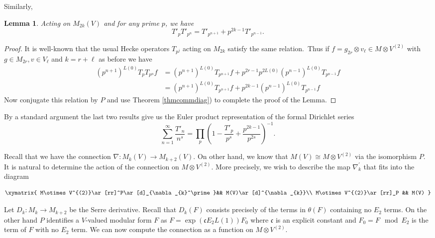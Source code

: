 \documentclass[12pt]{amsart}
\theoremstyle{plain}
\newtheorem{lem}[thm]{Lemma}
\theoremstyle{definition}
\theoremstyle{remark}
\begin{document}
Similarly,
 \begin{lem}
    Acting on $M_{2k}(V)$ and for any prime $p$,  we have 
    $$ T'_pT'_{p^n} =T'_{p^{n+1}}+p^{2k-1}T'_{p^{n-1}}.$$
 \end{lem}
 \begin{proof} It is well-known that the usual Hecke operators $T_{p^j}$ acting on $M_{2k}$ satisfy the same relation.\ Thus if $f=g_{2r}\otimes v_{\ell}\in M\otimes V^{(2)}$ with $g\in M_{2r}, v\in V_{\ell}$ and $k=r+\ell$ as before we have 
 \begin{align*} 
 (p^{n+1})^{L(0)}T_p T_{p^n}f &= (p^{n+1})^{L(0)}T_{p^{n+1}}f+ p^{2r-1}p^{2L(0)}(p^{n-1})^{L(0)}T_{p^{n-1}}f\\
 &=(p^{n+1})^{L(0)}T_{p^{n+1}}f+ p^{2k-1}(p^{n-1})^{L(0)}T_{p^{n-1}}f
 \end{align*}
 Now conjugate this relation by $P$
 and use Theorem \ref{thmcommdiag})
 to complete the proof of the Lemma.
\end{proof}

By a standard argument the last two results give us the Euler product representation of the formal Dirichlet series
\begin{equation}
\label{Dseries}
 \sum_{n=1}^{\infty} \frac{T'_n}{n^s} =
 \prod_p \left( 1 - \frac{T'_p}{p^s}+\frac{p^{2k-1}}{p^{2s}}\right)^{-1}.
\end{equation}

Recall that we have the connection $\nabla\colon M_k(V)\rightarrow M_{k+2}(V)$. On other hand, we know that $M(V)\cong M\otimes V^{(2)}$ via the isomorphism $P$. It is natural to determine the action of the connection on $M\otimes V^{(2)}$. More precisely, we wish to describe the map $\nabla_{k}^\prime$ that fits into the diagram

\begin{equation}
    \xymatrix{
M\otimes V^{(2)}\ar[rr]^P\ar[d]_{\nabla_{k}^\prime}&& M(V)\ar[d]^{\nabla_{k}}\\
M\otimes V^{(2)}\ar[rr]_P && M(V)
    }
    \end{equation}

    Let $D_k\colon M_k\rightarrow M_{k+2}$ be the Serre derivative. Recall that $D_k(F)$ consists precisely of the terms in $\theta(F)$ containing no $E_2$ terms. On the other hand $P$ identifies a $V$-valued modular form $F$ as $F=\exp(\mathfrak{c}E_2L(1))F_0$ where $\mathfrak{c}$ is an explicit constant and $F_0=F\mod E_2$ is the term of $F$ with no $E_2$ term. We can now compute the connection as a function on $M\otimes V^{(2)}$.
\end{document}
